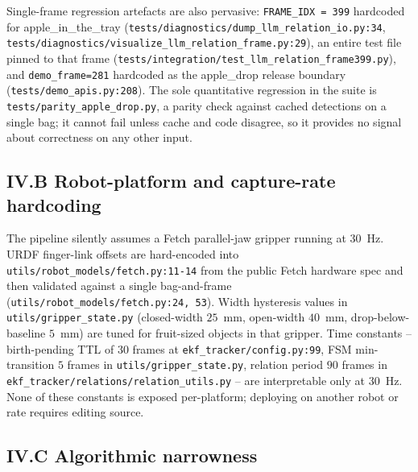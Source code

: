 \documentclass[11pt]{article}
\begin{document}
Single-frame regression artefacts are also pervasive: \texttt{FRAME\_IDX
= 399} hardcoded for apple\_in\_the\_tray (\texttt{tests/diagnostics/dump\_llm\_relation\_io.py:34},
\texttt{tests/diagnostics/visualize\_llm\_relation\_frame.py:29}),
an entire test file pinned to that frame
(\texttt{tests/integration/test\_llm\_relation\_frame399.py}), and
\texttt{demo\_frame=281} hardcoded as the apple\_drop release boundary
(\texttt{tests/demo\_apis.py:208}). The sole quantitative regression in
the suite is \texttt{tests/parity\_apple\_drop.py}, a parity check against
cached detections on a single bag; it cannot fail unless cache and code
disagree, so it provides no signal about correctness on any other input.

\subsection*{IV.B Robot-platform and capture-rate hardcoding}

The pipeline silently assumes a Fetch parallel-jaw gripper running at
30~Hz. URDF finger-link offsets are hard-encoded into
\texttt{utils/robot\_models/fetch.py:11-14} from the public Fetch hardware
spec and then validated against a single bag-and-frame
(\texttt{utils/robot\_models/fetch.py:24, 53}). Width hysteresis values
in \texttt{utils/gripper\_state.py} (closed-width $25$~mm, open-width
$40$~mm, drop-below-baseline $5$~mm) are tuned for fruit-sized objects in
that gripper. Time constants -- birth-pending TTL of $30$ frames at
\texttt{ekf\_tracker/config.py:99}, FSM min-transition $5$ frames in
\texttt{utils/gripper\_state.py}, relation period $90$ frames in
\texttt{ekf\_tracker/relations/relation\_utils.py} -- are interpretable
only at $30$~Hz. None of these constants is exposed per-platform; deploying
on another robot or rate requires editing source.

\subsection*{IV.C Algorithmic narrowness}
\end{document}
